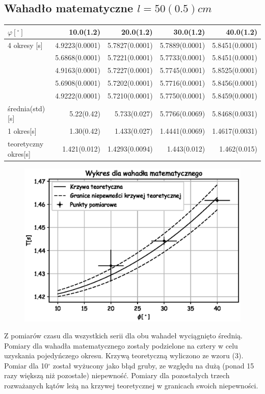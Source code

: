 \documentclass[a4paper,10pt]{article}
\begin{document}
\subsection{Wahadło matematyczne $l=50(0.5)cm$}
\begin{tabular}{lrrrr}
\toprule
{$\varphi[^\circ]$} & 10.0(1.2) & 20.0(1.2)&  30.0(1.2)&40.0(1.2)\\
\midrule
4 okresy [s]&  4.9223(0.0001) &  5.7827(0.0001) &  5.7889(0.0001) &  5.8451(0.0001) \\
    &  5.6868(0.0001) &  5.7221(0.0001) &  5.7733(0.0001) &  5.8451(0.0001) \\
    &  4.9163(0.0001) &  5.7227(0.0001) &  5.7745(0.0001) &  5.8525(0.0001) \\
    &  5.6908(0.0001) &  5.7202(0.0001) &  5.7716(0.0001) &  5.8456(0.0001) \\
    &  4.9222(0.0001) &  5.7210(0.0001) &  5.7750(0.0001) &  5.8459(0.0001) \\\hline
średnia(std)[s]& 5.22(0.42) & 5.733(0.027) & 5.7766(0.0069) & 5.8468(0.0031)		\\\hline
1	okres[s]&	1.30(0.42) & 1.433(0.027) & 1.4441(0.0069) & 1.4617(0.0031) \\\hline
teoretyczny okres[s] & 1.421(0.012) & 1.4293(0.0094) & 1.443(0.012) & 1.462(0.015)\\
\bottomrule
\end{tabular}
\begin{figure}[H]
    \includegraphics{./Wykres_matematyczne.eps}
    \caption{}
    \label{}
\end{figure}
Z pomiarów czasu dla wszystkich serii dla obu wahadeł wyciągnięto średnią. Pomiary dla wahadła matematycznego zostały podzielone na cztery w celu uzyskania pojedyńczego okresu. Krzywą teoretyczną wyliczono ze wzoru (3). Pomiar dla 10$^\circ$ został wyżucony jako błąd gruby, ze względu na dużą (ponad 15 razy większą niż pozostałe) niepewność. Pomiary dla pozostałych trzech rozważanych kątów leżą na krzywej teoretycznej w granicach swoich niepewności.
\end{document}
